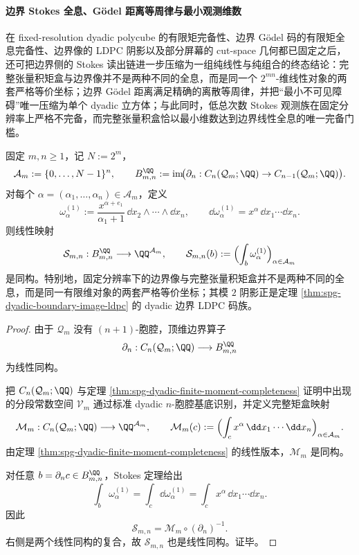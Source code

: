 \paragraph{边界 Stokes 全息、Gödel 距离等周律与最小观测维数}
在 fixed-resolution dyadic polycube 的有限矩完备性、边界 Gödel 码的有限矩全息完备性、边界像的 LDPC 阴影以及部分屏幕的 cut-space 几何都已固定之后，还可把边界侧的 Stokes 读出链进一步压缩为一组纯线性与纯组合的终态结论：完整张量积矩盒与边界像并不是两种不同的全息，而是同一个 \(2^{mn}\)-维线性对象的两套严格等价坐标；边界 Gödel 距离满足精确的离散等周律，并把“最小不可见障碍”唯一压缩为单个 dyadic 立方体；与此同时，低总次数 Stokes 观测族在固定分辨率上严格不完备，而完整张量积盒恰以最小维数达到边界线性全息的唯一完备门槛。

\begin{theorem}\label{thm:conclusion-boundary-stokes-strict-linear-holography}
固定 \(m,n\ge 1\)，记 \(N:=2^m\)，
\[
\mathcal A_m:=\{0,\dots,N-1\}^n,
\qquad
B_{m,n}^{\QQ}:=\operatorname{im}\!\bigl(\partial_n:C_n(\mathcal Q_m;\QQ)\to C_{n-1}(\mathcal Q_m;\QQ)\bigr).
\]
对每个 \(\alpha=(\alpha_1,\dots,\alpha_n)\in\mathcal A_m\)，定义
\[
\omega^{(1)}_{\alpha}
:=
\frac{x^{\alpha+e_1}}{\alpha_1+1}\,\dd x_2\wedge\cdots\wedge \dd x_n,
\qquad
\dd\omega^{(1)}_{\alpha}=x^\alpha\,\dd x_1\cdots \dd x_n.
\]
则线性映射
\[
\mathcal S_{m,n}:B_{m,n}^{\QQ}\longrightarrow \QQ^{\mathcal A_m},
\qquad
\mathcal S_{m,n}(b):=
\Bigl(\int_b\omega^{(1)}_{\alpha}\Bigr)_{\alpha\in\mathcal A_m}
\]
是同构。特别地，固定分辨率下的边界像与完整张量积矩盒并不是两种不同的全息，而是同一有限维对象的两套严格等价坐标；其模 \(2\) 阴影正是定理 \ref{thm:spg-dyadic-boundary-image-ldpc} 的 dyadic 边界 LDPC 码族。
\end{theorem}

\begin{proof}
由于 \(\mathcal Q_m\) 没有 \((n+1)\)-胞腔，顶维边界算子
\[
\partial_n:C_n(\mathcal Q_m;\QQ)\longrightarrow B_{m,n}^{\QQ}
\]
为线性同构。

把 \(C_n(\mathcal Q_m;\QQ)\) 与定理 \ref{thm:spg-dyadic-finite-moment-completeness} 证明中出现的分段常数空间 \(\mathcal V_m\) 通过标准 dyadic \(n\)-胞腔基底识别，并定义完整矩盒映射
\[
\mathcal M_m:C_n(\mathcal Q_m;\QQ)\longrightarrow \QQ^{\mathcal A_m},
\qquad
\mathcal M_m(c):=
\Bigl(\int_c x^\alpha\,\dd x_1\cdots \dd x_n\Bigr)_{\alpha\in\mathcal A_m}.
\]
由定理 \ref{thm:spg-dyadic-finite-moment-completeness} 的线性版本，\(\mathcal M_m\) 是同构。

对任意 \(b=\partial_n c\in B_{m,n}^{\QQ}\)，Stokes 定理给出
\[
\int_b\omega^{(1)}_{\alpha}
=
\int_c \dd\omega^{(1)}_{\alpha}
=
\int_c x^\alpha\,\dd x_1\cdots\dd x_n.
\]
因此
\[
\mathcal S_{m,n}
=
\mathcal M_m\circ (\partial_n)^{-1}.
\]
右侧是两个线性同构的复合，故 \(\mathcal S_{m,n}\) 也是线性同构。证毕。
\end{proof}

